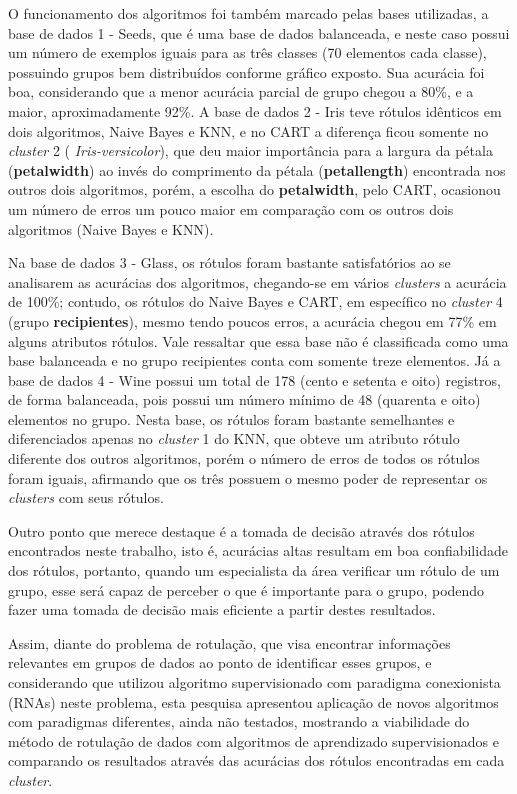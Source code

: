  

O funcionamento dos algoritmos foi também marcado pelas bases utilizadas, a base de dados 1 - Seeds, que é uma base de dados balanceada, e neste caso possui um número de exemplos iguais para as três classes (70 elementos cada classe), possuindo grupos bem distribuídos conforme gráfico exposto. Sua acurácia foi boa, considerando que a menor acurácia parcial de grupo chegou a 80\%, e a maior, aproximadamente 92\%. A base de dados 2 - Iris teve rótulos idênticos em dois algoritmos, Naive Bayes e KNN, e no CART a diferença ficou somente no \textit{cluster} 2 ( \textit{Iris-versicolor}), que deu maior importância para a largura da pétala (\textbf{petalwidth}) ao invés do comprimento da pétala (\textbf{petallength}) encontrada nos outros dois algoritmos, porém, a escolha do \textbf{petalwidth}, pelo CART, ocasionou um número de erros um pouco maior em comparação com os outros dois algoritmos (Naive Bayes e KNN). 

Na base de dados 3 - Glass, os rótulos foram bastante satisfatórios ao se analisarem as acurácias dos algoritmos, chegando-se em vários \textit{clusters} a acurácia de 100\%; contudo, os rótulos do Naive Bayes e CART, em específico no \textit{cluster} 4 (grupo \textbf{recipientes}), mesmo tendo poucos erros, a acurácia chegou em 77\% em alguns atributos rótulos. Vale ressaltar que essa base não é classificada como uma base balanceada e no grupo recipientes conta com somente treze elementos. Já a base de dados 4 - Wine possui um total de 178 (cento e setenta e oito) registros, de forma balanceada, pois possui um número mínimo de 48 (quarenta e oito) elementos no grupo. Nesta base, os rótulos foram bastante semelhantes e diferenciados apenas no \textit{cluster} 1 do KNN, que obteve um atributo rótulo diferente dos outros algoritmos, porém o número de erros de todos os rótulos foram iguais, afirmando que os três possuem o mesmo poder de representar os \textit{clusters} com seus rótulos. 

Outro ponto que merece destaque é a tomada de decisão através dos rótulos encontrados neste trabalho, isto é, acurácias altas resultam em boa confiabilidade dos rótulos, portanto, quando um especialista da área verificar um rótulo de um grupo, esse será capaz de perceber o que é importante para o grupo, podendo fazer uma tomada de decisão mais eficiente a partir destes resultados. 


Assim, diante do problema de rotulação, que visa encontrar informações relevantes em grupos de dados ao ponto de identificar esses grupos, e considerando que  utilizou algoritmo supervisionado com paradigma conexionista (RNAs) neste problema, esta pesquisa apresentou aplicação de novos algoritmos com paradigmas diferentes, ainda não testados, mostrando a viabilidade do método de rotulação de dados com algoritmos de aprendizado supervisionados e comparando os resultados através das acurácias dos rótulos encontradas em cada \textit{cluster}. 


